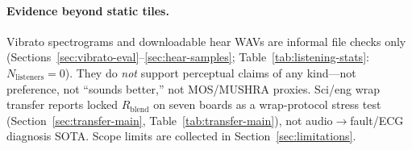 \paragraph{Evidence beyond static tiles.}
Vibrato spectrograms and downloadable hear WAVs are informal file checks only
(Sections~\ref{sec:vibrato-eval}--\ref{sec:hear-samples}; Table~\ref{tab:listening-stats}: $N_{\mathrm{listeners}}{=}0$).
They do \emph{not} support perceptual claims of any kind---not preference, not ``sounds better,'' not MOS/MUSHRA proxies.
Sci/eng wrap transfer reports locked $R_{\mathrm{blend}}$ on seven boards as a wrap-protocol stress test
(Section~\ref{sec:transfer-main}, Table~\ref{tab:transfer-main}), not audio$\to$fault/ECG diagnosis SOTA.
Scope limits are collected in Section~\ref{sec:limitations}.
